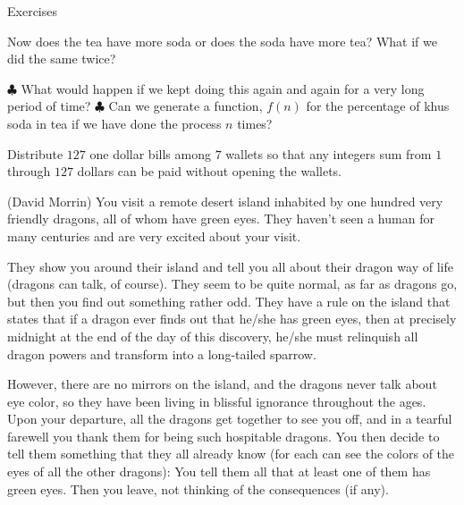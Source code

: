\begin{xcb}{Exercises}
\begin{exc}
Now does the tea have more soda or does the soda have more tea? What if we did the same twice?


\(\clubsuit\)  What would happen if we kept doing this again and again for a very long period of time? $\clubsuit$ Can we generate a function, $f(n)$ for the percentage of khus soda in tea if we have done the process $n$ times?
\begin{hint}
\end{hint}

\item {} Distribute \(127\) one dollar bills among \(7\) wallets so that any integers sum 
from \(1\) through \(127\) dollars can be paid without opening the wallets.
\begin{hint}
\end{hint}

\item (David Morrin)  You visit a remote desert island inhabited by one hundred very friendly
dragons, all of whom have green eyes. They haven’t seen a human for many centuries and are very 
excited about your visit. 

They show you around their island and tell you all about their dragon way of life (dragons can talk, of course).
They seem to be quite normal, as far as dragons go, but then you find out something rather odd. 
They have a rule on the island that states that if a dragon ever finds out that he/she has green eyes, 
then at precisely midnight at the end of the day of this discovery, he/she must relinquish all dragon powers and transform into a long-tailed sparrow. 

However, there are no mirrors on the island, and the dragons never talk about eye color, 
so they have been living in blissful ignorance throughout the ages. 
Upon your departure, all the dragons get together to see you off, and in a tearful farewell you thank them for being such hospitable dragons. 
You then decide to tell them something that they all already know (for each can see the colors of the eyes of all the other dragons): 
You tell them all that at least one of them has green eyes. Then you leave, not thinking of the consequences (if any). 


\end{exc}
\end{xcb}
